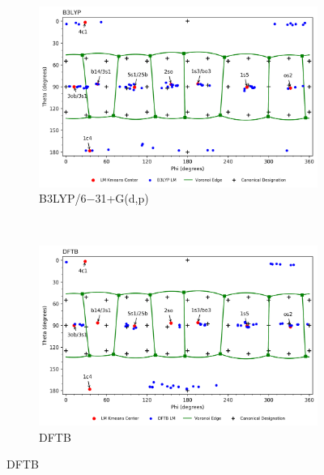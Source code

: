 \documentclass{article}
\begin{document}
\begin{figure}[H]
	\centering
   	\begin{subfigure}[b]{0.49\textwidth}
   	\includegraphics[width=1\textwidth,keepaspectratio]
   	{figures/bxyl/overall/z_dataset-bxyl-LM-B3LYP-all_groupings.png}
   	\caption{B3LYP/6$-$31+G(d,p)}
	\end{subfigure}
	~
	\begin{subfigure}[b]{0.49\textwidth}
	\includegraphics[width=1\textwidth,keepaspectratio]
   	{figures/bxyl/overall/z_dataset-bxyl-LM-DFTB-all_groupings.png}
	\caption{DFTB}
	\end{subfigure}
\end{figure}
\end{document}
